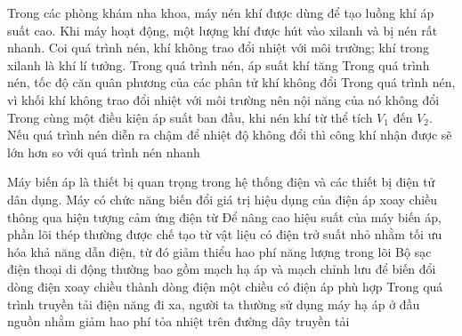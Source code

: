 	\begin{ex}%
		Trong các phòng khám nha khoa, máy nén khí được dùng để tạo luồng khí áp suất cao. Khi máy hoạt động, một lượng khí được hút vào xilanh và bị nén rất nhanh. Coi quá trình nén, khí không trao đổi nhiệt với môi trường; khí trong xilanh là khí lí tưởng.
		\choiceTFt
		{\True Trong quá trình nén, áp suất khí tăng}
		{Trong quá trình nén, tốc độ căn quân phương của các phân tử khí không đổi}
		{Trong quá trình nén, vì khối khí không trao đổi nhiệt với môi trường nên nội năng của nó không đổi}
		{Trong cùng một điều kiện áp suất ban đầu, khi nén khí từ thể tích $V_1$ đến $V_2$. Nếu quá trình nén diễn ra chậm để nhiệt độ không đổi thì công khí nhận được sẽ lớn hơn so với quá trình nén nhanh}
	\end{ex}

	\begin{ex}%
		Máy biến áp là thiết bị quan trọng trong hệ thống điện và các thiết bị điện tử dân dụng.
		\choiceTFt
		{\True Máy có chức năng biến đổi giá trị hiệu dụng của điện áp xoay chiều thông qua hiện tượng cảm ứng điện từ}
		{Để nâng cao hiệu suất của máy biến áp, phần lõi thép thường được chế tạo từ vật liệu có điện trở suất nhỏ nhằm tối ưu hóa khả năng dẫn điện, từ đó giảm thiểu hao phí năng lượng trong lõi}
		{\True Bộ sạc điện thoại di động thường bao gồm mạch hạ áp và mạch chỉnh lưu để biến đổi dòng điện xoay chiều thành dòng điện một chiều có điện áp phù hợp}
		{Trong quá trình truyền tải điện năng đi xa, người ta thường sử dụng máy hạ áp ở đầu nguồn nhằm giảm hao phí tỏa nhiệt trên đường dây truyền tải}
	\end{ex}


